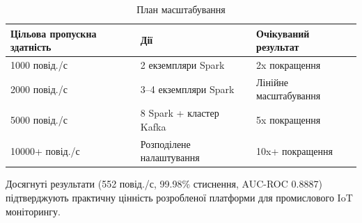 \begin{table}[h]
\caption{План масштабування}
\label{tab:scaling_roadmap}
\begin{tabular}{@{}lll@{}}
\toprule
Цільова пропускна здатність & Дії & Очікуваний результат \\
\midrule
1000 повід./с & 2 екземпляри Spark & 2x покращення \\
2000 повід./с & 3--4 екземпляри Spark & Лінійне масштабування \\
5000 повід./с & 8 Spark + кластер Kafka & 5x покращення \\
10000+ повід./с & Розподілене налаштування & 10x+ покращення \\
\bottomrule
\end{tabular}
\end{table}

Досягнуті результати (552 повід./с, 99.98\% стиснення, AUC-ROC 0.8887) підтверджують практичну цінність розробленої платформи для промислового IoT моніторингу.

